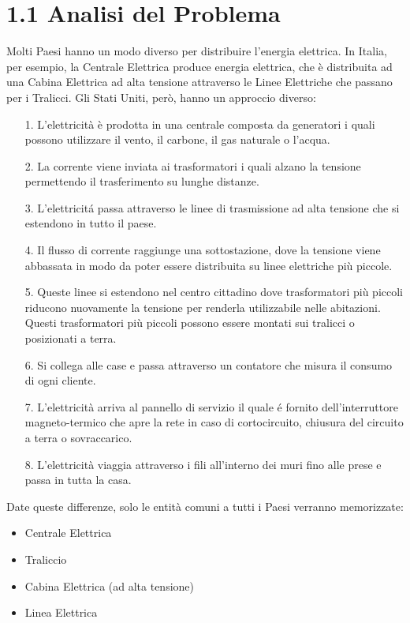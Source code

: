 \section*{1.1 \hspace{1cm} Analisi del Problema}
Molti Paesi hanno un modo diverso per distribuire l'energia elettrica. In Italia, per esempio, la Centrale Elettrica produce energia elettrica, che è distribuita ad una Cabina Elettrica ad alta tensione attraverso le Linee Elettriche che passano per i Tralicci.
Gli Stati Uniti, però, hanno un approccio diverso:
\begin{itemize}
    \item[1.] L'elettricità è prodotta in una centrale composta da generatori i quali possono utilizzare il vento, il carbone, il gas naturale o l'acqua.
    \item[2.] La corrente viene inviata ai trasformatori i quali alzano la tensione permettendo il trasferimento su lunghe distanze.
    \item[3.] L'elettricitá passa attraverso le linee di trasmissione ad alta tensione che si estendono in tutto il paese.
    \item[4.] Il flusso di corrente raggiunge una sottostazione, dove la tensione viene abbassata in modo da poter essere distribuita su linee elettriche più piccole.
    \item[5.] Queste linee si estendono nel centro cittadino dove trasformatori più piccoli riducono nuovamente la tensione per renderla utilizzabile nelle abitazioni. Questi trasformatori più piccoli possono essere montati sui tralicci o posizionati a terra.
    \item[6.] Si collega alle case e passa attraverso un contatore che misura il consumo di ogni cliente.
    \item[7.] L'elettricità arriva al pannello di servizio il quale é fornito dell'interruttore magneto-termico che apre la rete in caso di cortocircuito, chiusura del circuito a terra o sovraccarico.
    \item[8.] L'elettricità viaggia attraverso i fili all'interno dei muri fino alle prese e passa in tutta la casa.
\end{itemize}

Date queste differenze, solo le entità comuni a tutti i Paesi verranno memorizzate:
\begin{itemize}
    \item Centrale Elettrica
    \item Traliccio
    \item Cabina Elettrica (ad alta tensione)
    \item Linea Elettrica
\end{itemize}

